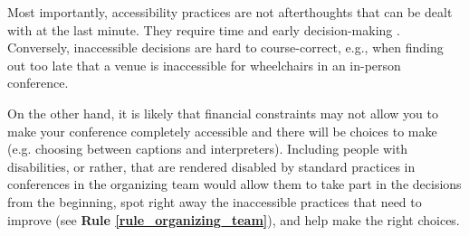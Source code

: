 \documentclass[10pt,letterpaper]{article}
\begin{document}

 
Most importantly, accessibility practices are not afterthoughts that can be dealt with at the last minute. 
They require time and early decision-making \cite{irishIncreasingParticipationUsing2020}. 
Conversely, inaccessible decisions are hard to course-correct, e.g., when finding out too late that a venue is inaccessible for wheelchairs in an in-person conference. 

On the other hand, it is likely that financial constraints may not allow you to make your conference completely accessible and there will be choices to make (e.g. choosing between captions and interpreters). 
Including people with disabilities, or rather, that are rendered disabled by standard practices in conferences in the organizing team would allow them to take part in the decisions from the beginning, spot right away the inaccessible practices that need to improve (see \textbf{Rule \ref{rule_organizing_team}}), and help make the right choices.

\end{document}
